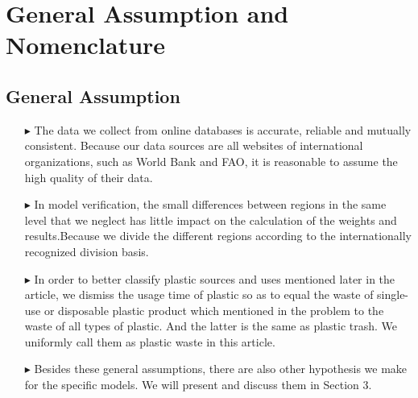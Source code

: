 \documentclass{mcmthesis}
\begin{document}
		
\section{General Assumption and Nomenclature}
	 \subsection{General Assumption}
	 \begin{itemize}     
		\item[$\blacktriangleright$]The data we collect from online databases is accurate, reliable and mutually consistent. Because our data sources are all websites of international organizations, such as World Bank and FAO, it is reasonable to assume the high quality of their data.\\
		\item[$\blacktriangleright$] In model verification, the small differences between regions in the same level that we neglect has little impact on the calculation of the weights and results.Because we divide the different regions according to the internationally recognized division basis. \\
		\item[$\blacktriangleright$] In order to better classify plastic sources and uses mentioned later in the article, we dismiss the usage time of plastic so as to equal the waste of single-use or disposable plastic product which mentioned in the problem to the waste of all types of plastic. And the latter is the same as plastic trash. We uniformly call them as plastic waste in this article.\\
		\item[$\blacktriangleright$]Besides these general assumptions, there are also other hypothesis we make for the specific models. We will present and discuss them in Section 3.\\
		\end{itemize}
\end{document}
